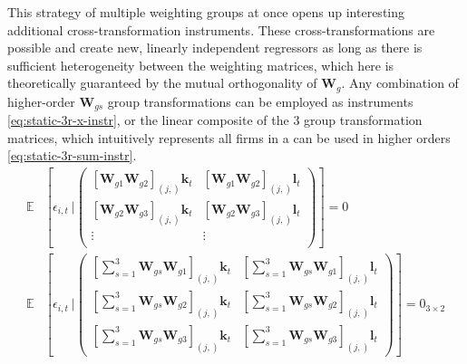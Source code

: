 This strategy of multiple weighting groups at once
opens up interesting additional cross-transformation instruments.
These cross-transformations are possible
and create new, linearly independent regressors
as long as there is sufficient heterogeneity between the weighting matrices,
which here is theoretically guaranteed by the mutual orthogonality of $\mathbf W_g$.
Any combination of higher-order $\mathbf W_{gs}$ group transformations
can be employed as instruments \eqref{eq:static-3r-x-instr},
or the linear composite of the 3 group transformation matrices,
which intuitively represents all firms in a 
can be used in higher orders \eqref{eq:static-3r-sum-instr}.
\begin{align}
    \label{eq:static-3r-x-instr}
    \mathbb E &[
        \epsilon_{i,t}\ 
        \vert
        \begin{pmatrix}
            \left[\mathbf W_{g1}\mathbf W_{g2}\right]_{(j,)} \mathbf k_t & \left[\mathbf W_{g1}\mathbf W_{g2}\right]_{(j,)} \mathbf l_t\\
            \left[\mathbf W_{g2}\mathbf W_{g3}\right]_{(j,)} \mathbf k_t & \left[\mathbf W_{g2}\mathbf W_{g3}\right]_{(j,)} \mathbf l_t\\
            \vdots & \vdots \\
        \end{pmatrix}
    ]
    = 0
    \\
    \label{eq:static-3r-sum-instr}
    \mathbb E &[
        \epsilon_{i,t}\ 
        \vert
        \begin{pmatrix}
            \left[\sum_{s=1}^3\mathbf W_{gs}\mathbf W_{g1}\right]_{(j,)} \mathbf k_t
            & \left[\sum_{s=1}^3\mathbf W_{gs}\mathbf W_{g1}\right]_{(j,)} \mathbf l_t
            \\
            \left[\sum_{s=1}^3\mathbf W_{gs}\mathbf W_{g2}\right]_{(j,)} \mathbf k_t
            & \left[\sum_{s=1}^3\mathbf W_{gs}\mathbf W_{g2}\right]_{(j,)} \mathbf l_t
            \\
            \left[\sum_{s=1}^3\mathbf W_{gs}\mathbf W_{g3}\right]_{(j,)} \mathbf k_t
            & \left[\sum_{s=1}^3\mathbf W_{gs}\mathbf W_{g3}\right]_{(j,)} \mathbf l_t
        \end{pmatrix}
    ]
    = 0_{3\times 2}
\end{align}

